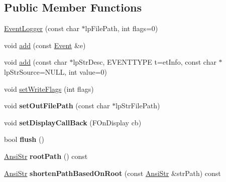 \subsection*{Public Member Functions}
\begin{DoxyCompactItemize}
\item 
\hyperlink{classps_1_1utils_1_1EventLogger_a952c1d904e9dbe976bc80919413bdaa7}{Event\+Logger} (const char $\ast$lp\+File\+Path, int flags=0)
\item 
void \hyperlink{classps_1_1utils_1_1EventLogger_a408da0eba198ea67f4f5dd2cbad50a5b}{add} (const \hyperlink{structps_1_1utils_1_1EventLogger_1_1Event}{Event} \&e)
\item 
void \hyperlink{classps_1_1utils_1_1EventLogger_a1218f827938c74c78d96ab63f0a826a1}{add} (const char $\ast$lp\+Str\+Desc, E\+V\+E\+N\+T\+T\+Y\+P\+E t=et\+Info, const char $\ast$lp\+Str\+Source=N\+U\+L\+L, int value=0)
\item 
void \hyperlink{classps_1_1utils_1_1EventLogger_ac86c18aa6df7a5eb774d34d31dde0451}{set\+Write\+Flags} (int flags)
\item 
\hypertarget{classps_1_1utils_1_1EventLogger_a385bd436b0f21cbf11c7a554b9f0dcab}{}void {\bfseries set\+Out\+File\+Path} (const char $\ast$lp\+Str\+File\+Path)\label{classps_1_1utils_1_1EventLogger_a385bd436b0f21cbf11c7a554b9f0dcab}

\item 
\hypertarget{classps_1_1utils_1_1EventLogger_a0f6b79c708ee991dc18adbdd8aff6ffb}{}void {\bfseries set\+Display\+Call\+Back} (F\+On\+Display cb)\label{classps_1_1utils_1_1EventLogger_a0f6b79c708ee991dc18adbdd8aff6ffb}

\item 
\hypertarget{classps_1_1utils_1_1EventLogger_ab5f54fa75186ec718accd369bde4a138}{}bool {\bfseries flush} ()\label{classps_1_1utils_1_1EventLogger_ab5f54fa75186ec718accd369bde4a138}

\item 
\hypertarget{classps_1_1utils_1_1EventLogger_a38e7c4ad4cfe86133f0055481f4f1d77}{}\hyperlink{classps_1_1base_1_1CAString}{Ansi\+Str} {\bfseries root\+Path} () const \label{classps_1_1utils_1_1EventLogger_a38e7c4ad4cfe86133f0055481f4f1d77}

\item 
\hypertarget{classps_1_1utils_1_1EventLogger_ae39e90031c86daa9ab9dc1e5e6f0793a}{}\hyperlink{classps_1_1base_1_1CAString}{Ansi\+Str} {\bfseries shorten\+Path\+Based\+On\+Root} (const \hyperlink{classps_1_1base_1_1CAString}{Ansi\+Str} \&str\+Path) const \label{classps_1_1utils_1_1EventLogger_ae39e90031c86daa9ab9dc1e5e6f0793a}

\end{DoxyCompactItemize}


